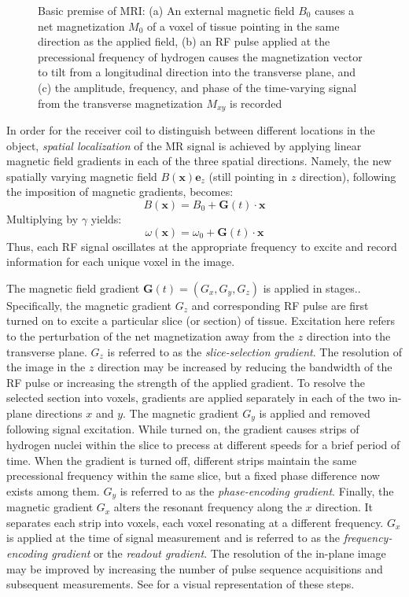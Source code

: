 \begin{figure}[ht]
{\label{fig:mr23}}
%
\caption{Basic premise of MRI: (a) An external magnetic field $B_0$ causes a net magnetization $M_0$ of a voxel of tissue pointing in the same direction as the applied field, (b) an RF pulse applied at the precessional frequency of hydrogen causes the magnetization vector to tilt from a longitudinal direction into the transverse plane, and (c) the amplitude, frequency, and phase of the time-varying signal from the transverse magnetization $M_{xy}$ is recorded~\cite{hendrick_1994}}
\label{fig:mr2}
\end{figure}

In order for the receiver coil to distinguish between different locations in the object, \textit{spatial localization} of the MR signal is achieved by applying linear magnetic field gradients in each of the three spatial directions. Namely, the new spatially varying magnetic field $B(\bm{x})\bm{e}_z$ (still pointing in $z$ direction), following the imposition of magnetic gradients, becomes:
\begin{equation}
B(\bm{x}) = B_0 + \bm{G}(t) \cdot \bm{x}
\label{eqn:gradient}
\end{equation}
Multiplying  by $\gamma$ yields:
\begin{equation}
\omega(\bm{x}) = \omega_0 + \bm{G}(t) \cdot \bm{x}
\label{eqn:freq}
\end{equation}
Thus, each RF signal oscillates at the appropriate frequency to excite and record information for each unique voxel in the image.

The magnetic field gradient $\bm{G}(t) = (G_x, G_y, G_z)$ is applied in stages.. Specifically, the magnetic gradient $G_z$ and corresponding RF pulse are first turned on to excite a particular slice (or section) of tissue. Excitation here refers to the perturbation of the net magnetization away from the $z$ direction into the transverse plane. $G_z$ is referred to as the \textit{slice-selection gradient}. The resolution of the image in the $z$ direction may be increased by reducing the bandwidth of the RF pulse or increasing the strength of the applied gradient. To resolve the selected section into voxels, gradients are applied separately in each of the two in-plane directions $x$ and $y$. The magnetic gradient $G_y$ is applied and removed following signal excitation. While turned on, the gradient causes strips of hydrogen nuclei within the slice to precess at different speeds for a brief period of time. When the gradient is turned off, different strips maintain the same precessional frequency within the same slice, but a fixed phase difference now exists among them. $G_y$ is referred to as the \textit{phase-encoding gradient}. Finally, the magnetic gradient $G_x$ alters the resonant frequency along the $x$ direction. It separates each strip into voxels, each voxel resonating at a different frequency. $G_x$ is applied at the time of signal measurement and is referred to as the  \textit{frequency-encoding gradient} or the \textit{readout gradient}. The resolution of the in-plane image may be improved by increasing the number of pulse sequence acquisitions and subsequent measurements. See  for a visual representation of these steps.

